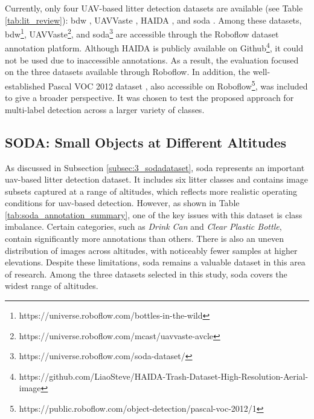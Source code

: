 Currently, only four UAV-based litter detection datasets are available (see Table \ref{tab:lit_review}): \gls{bdw} \cite{bdwdataset}, UAVVaste \cite{uavvaste}, HAIDA \cite{haida}, and \gls{soda} \cite{soda_dataset}. Among these datasets, \gls{bdw}\footnote{https://universe.roboflow.com/bottles-in-the-wild}, UAVVaste\footnote{https://universe.roboflow.com/mcast/uavvaste-avcle}, and \gls{soda}\footnote{https://universe.roboflow.com/soda-dataset/} are accessible through the Roboflow dataset annotation platform. Although HAIDA is publicly available on Github\footnote{https://github.com/LiaoSteve/HAIDA-Trash-Dataset-High-Resolution-Aerial-image}, it could not be used due to inaccessible annotations. As a result, the evaluation focused on the three datasets available through Roboflow. In addition, the well-established Pascal VOC 2012 dataset \cite{pascal-voc-2012}, also accessible on Roboflow\footnote{https://public.roboflow.com/object-detection/pascal-voc-2012/1}, was included to give a broader perspective. It was chosen to test the proposed approach for multi-label detection across a larger variety of classes.


\subsection{SODA: Small Objects at Different Altitudes}
\label{subsec:4_soda}

As discussed in Subsection \ref{subsec:3_sodadataset}, \gls{soda} represents an important \gls{uav}-based litter detection dataset. It includes six litter classes and contains image subsets captured at a range of altitudes, which reflects more realistic operating conditions for \gls{uav}-based detection.
However, as shown in Table \ref{tab:soda_annotation_summary}, one of the key issues with this dataset is class imbalance. Certain categories, such as \textit{Drink Can} and \textit{Clear Plastic Bottle}, contain significantly more annotations than others. There is also an uneven distribution of images across altitudes, with noticeably fewer samples at higher elevations.
Despite these limitations, \gls{soda} remains a valuable dataset in this area of research. Among the three datasets selected in this study, \gls{soda} covers the widest range of altitudes.

